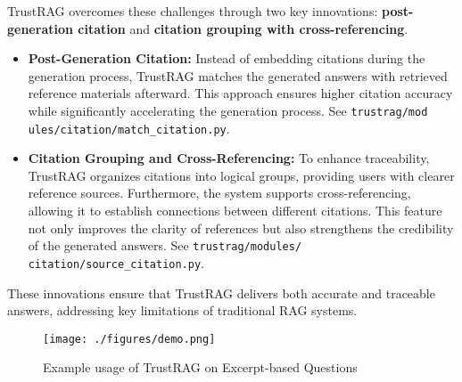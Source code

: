 TrustRAG overcomes these challenges through two key innovations: \textbf{post-generation citation} and \textbf{citation grouping with cross-referencing}.
\begin{itemize}
    \item \textbf{Post-Generation Citation:} Instead of embedding citations during the generation process, TrustRAG matches the generated answers with retrieved reference materials afterward. This approach ensures higher citation accuracy while significantly accelerating the generation process. See \texttt{trustrag/mod
    ules/citation/match\_citation.py}.
    
    \item \textbf{Citation Grouping and Cross-Referencing:} To enhance traceability, TrustRAG organizes citations into logical groups, providing users with clearer reference sources. Furthermore, the system supports cross-referencing, allowing it to establish connections between different citations. This feature not only improves the clarity of references but also strengthens the credibility of the generated answers. See \texttt{trustrag/modules/
    citation/source\_citation.py}.
\end{itemize}
These innovations ensure that TrustRAG delivers both accurate and traceable answers, addressing key limitations of traditional RAG systems.

\begin{figure*}[!t]
\centering
\texttt{[image: ./figures/demo.png]}
\caption{Example usage of TrustRAG on Excerpt-based Questions}
\label{fig:demo}
\end{figure*}

